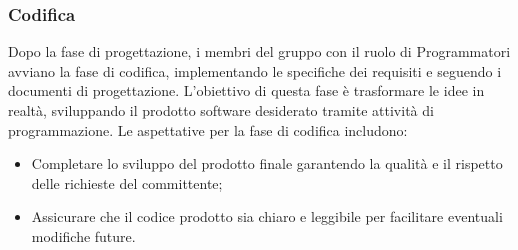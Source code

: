 \subsubsection{Codifica}
Dopo la fase di progettazione, i membri del gruppo con il ruolo di Programmatori avviano la fase di codifica, 
implementando le specifiche dei requisiti e seguendo i documenti di progettazione.
L’obiettivo di questa fase è trasformare le idee in realtà, sviluppando il prodotto software desiderato tramite 
attività di programmazione. 
Le aspettative per la fase di codifica includono:
\begin{itemize}
    \item Completare lo sviluppo del prodotto finale garantendo la qualità e il rispetto delle richieste del committente;
    \item Assicurare che il codice prodotto sia chiaro e leggibile per facilitare eventuali modifiche future.
\end{itemize}
